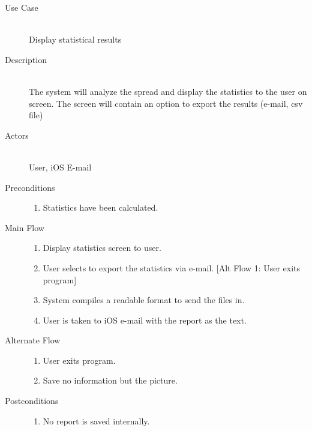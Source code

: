 \begin{description}
    \item[Use Case] \hfill \\
        Display statistical results
    \item[Description] \hfill \\
        The system will analyze the spread and display the statistics to the user on screen.  The screen will contain an option to export the results (e-mail, csv file)
    \item[Actors] \hfill \\
        User, iOS E-mail
    \item[Preconditions] \hfill 
        \begin{enumerate}
            \item Statistics have been calculated.
        \end{enumerate}
    \item[Main Flow] \hfill 
        \begin{enumerate}
            \item Display statistics screen to user.
            \item User selects to export the statistics via e-mail.
                [Alt Flow 1: User exits program]
            \item System compiles a readable format to send the files in.
            \item User is taken to iOS e-mail with the report as the text.
        \end{enumerate}
    \item[Alternate Flow] \hfill 
        \begin{enumerate}
            \item User exits program.
            \item Save no information but the picture.
        \end{enumerate}
    \item[Postconditions] \hfill
        \begin{enumerate}
            \item No report is saved internally.
        \end{enumerate}
\end{description}
